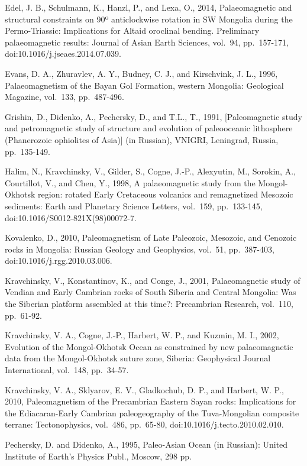\documentclass[11pt]{article}
\begin{document}
Edel, J. B., Schulmann, K., Hanzl, P., and Lexa, O., 2014,
Palaeomagnetic and structural constraints on 90º anticlockwise rotation
in SW Mongolia during the Permo-Triassic: Implications for Altaid
oroclinal bending. Preliminary palaeomagnetic results: Journal of Asian
Earth Sciences, vol.~94, pp.~157-171, doi:10.1016/j.jseaes.2014.07.039.

Evans, D. A., Zhuravlev, A. Y., Budney, C. J., and Kirschvink, J. L.,
1996, Palaeomagnetism of the Bayan Gol Formation, western Mongolia:
Geological Magazine, vol.~133, pp.~487-496.

Grishin, D., Didenko, A., Pechersky, D., and T.L., T., 1991,
{[}Paleomagnetic study and petromagnetic study of structure and
evolution of paleooceanic lithosphere (Phanerozoic ophiolites of
Asia){]} (in Russian), VNIGRI, Leningrad, Russia, pp.~135-149.

Halim, N., Kravchinsky, V., Gilder, S., Cogne, J.-P., Alexyutin, M.,
Sorokin, A., Courtillot, V., and Chen, Y., 1998, A palaeomagnetic study
from the Mongol-Okhotsk region: rotated Early Cretaceous volcanics and
remagnetized Mesozoic sediments: Earth and Planetary Science Letters,
vol.~159, pp.~133-145, doi:10.1016/S0012-821X(98)00072-7.

Kovalenko, D., 2010, Paleomagnetism of Late Paleozoic, Mesozoic, and
Cenozoic rocks in Mongolia: Russian Geology and Geophysics, vol.~51,
pp.~387-403, doi:10.1016/j.rgg.2010.03.006.

Kravchinsky, V., Konstantinov, K., and Conge, J., 2001, Palaeomagnetic
study of Vendian and Early Cambrian rocks of South Siberia and Central
Mongolia: Was the Siberian platform assembled at this time?: Precambrian
Research, vol.~110, pp.~61-92.

Kravchinsky, V. A., Cogne, J.-P., Harbert, W. P., and Kuzmin, M. I.,
2002, Evolution of the Mongol-Okhotsk Ocean as constrained by new
palaeomagnetic data from the Mongol-Okhotsk suture zone, Siberia:
Geophysical Journal International, vol.~148, pp.~34-57.

Kravchinsky, V. A., Sklyarov, E. V., Gladkochub, D. P., and Harbert, W.
P., 2010, Paleomagnetism of the Precambrian Eastern Sayan rocks:
Implications for the Ediacaran-Early Cambrian paleogeography of the
Tuva-Mongolian composite terrane: Tectonophysics, vol.~486, pp.~65-80,
doi:10.1016/j.tecto.2010.02.010.

Pechersky, D. and Didenko, A., 1995, Paleo-Asian Ocean (in Russian):
United Institute of Earth's Physics Publ., Moscow, 298 pp.
\end{document}
